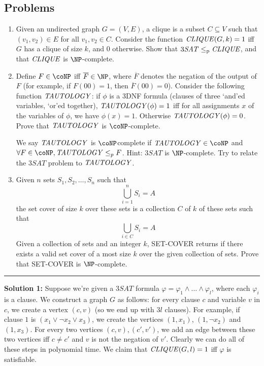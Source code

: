 \documentclass[10pt]{article}
\newcommand{\pred}{\leq_\text{p}}
\newcommand{\Line}{\vspace{.3cm}\hrule\vspace{.3cm}}
\newcommand{\TSAT}{3\mathit{SAT}}
\begin{document}
\subsection{Problems}
\begin{enumerate}
\item Given an undirected graph $G=(V,E)$, a clique is a subset $C \subseteq V$ such that $(v_1,v_2) \in E$ for all $v_1,v_2 \in C$. Consider the function $\mathit{CLIQUE}(G,k)=1$ iff $G$ has a clique of size $k$, and $0$ otherwise. Show that $\TSAT \pred \CLIQUE$, and that $\mathit{CLIQUE}$ is $\NP$-complete.


\item Define $F \in \coNP$ iff $\overline{F} \in \NP$, where $\overline{F}$ denotes the negation of the output of $F$ (for example, if $F(00)=1$, then $\overline{F}(00)=0$). Consider the following function $\mathit{TAUTOLOGY}$: if $\phi$ is a 3DNF formula (clauses of three `and'ed variables, `or'ed together), $\mathit{TAUTOLOGY}(\phi)=1$ iff for all assignments $x$ of the variables of $\phi$, we have $\phi(x)=1$. Otherwise $\mathit{TAUTOLOGY}(\phi)=0$. Prove that $\mathit{TAUTOLOGY}$ is $\coNP$-complete.

We say $\mathit{TAUTOLOGY}$ is $\coNP$complete if $\TAUT \in \coNP$ and $\forall F\in \coNP, \TAUT\leq_p F$. Hint: $\TSAT$ is $\NP$-complete. Try to relate the $\TSAT$ problem to $\mathit{TAUTOLOGY}$.

\item Given $n$ sets $S_1, S_2, \ldots, S_n$ such that $$\bigcup_{i=1}^{n} S_i = A$$ the set cover of size $k$ over these sets is a collection $C$ of $k$ of these sets such that $$\bigcup_{i \in C} S_i = A$$ Given a collection of sets and an integer $k$, SET-COVER returns if there exists a valid set cover of a most size $k$ over the given collection of sets. Prove that SET-COVER is $\NP$-complete.


\end{enumerate}
\Line
\textbf{Solution 1:} Suppose we're given a $\TSAT$ formula $\varphi=\varphi_1 \land \dots\land \varphi_l$, where each $\varphi_i$ is a clause. We construct a graph $G$ as follows: for every clause $c$ and variable $v$ in $c$, we create a vertex $(c,v)$ (so we end up with $3l$ clauses). For example, if clause $1$ is $(x_1 \lor \lnot x_2 \lor x_3)$, we create the vertices $(1,x_1)$, $(1,\lnot x_2)$ and $(1, x_3)$. For every two vertices $(c,v),(c',v')$, we add an edge between these two vertices iff $c \neq c'$ and $v$ is not the negation of $v'$. Clearly we can do all of these steps in polynomial time. We claim that $\mathit{CLIQUE}(G,l)=1$ iff $\varphi$ is satisfiable.\par
\end{document}
